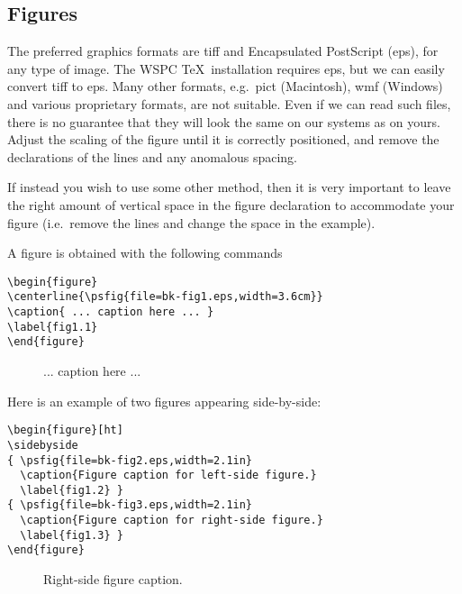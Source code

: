 \subsection{Figures}
The preferred graphics formats are tiff and Encapsulated PostScript
(eps), for any type of image. The WSPC \TeX\ installation requires
eps, but we can easily convert tiff to eps. Many other formats,
e.g.~pict (Macintosh), wmf (Windows) and various proprietary
formats, are not suitable. Even if we can read such files, there is
no guarantee that they will look the same on our systems as on
yours. Adjust the scaling of the figure until it is correctly
positioned, and remove the declarations of the lines and any
anomalous spacing.

If instead you wish to use some other method, then it is very
important to leave the right amount of vertical space in the figure
declaration to accommodate your figure (i.e.~remove the lines and
change the space in the example).

A figure is obtained with the following commands
\begin{verbatim}
\begin{figure}
\centerline{\psfig{file=bk-fig1.eps,width=3.6cm}}
\caption{ ... caption here ... }
\label{fig1.1}
\end{figure}
\end{verbatim}

\begin{figure}
\centerline{}
\caption{ ... caption here ... }
\label{fig1.1}
\end{figure}

Here is an example of two figures appearing side-by-side:
\begin{verbatim}
\begin{figure}[ht]
\sidebyside
{ \psfig{file=bk-fig2.eps,width=2.1in}
  \caption{Figure caption for left-side figure.}
  \label{fig1.2} }
{ \psfig{file=bk-fig3.eps,width=2.1in}
  \caption{Figure caption for right-side figure.}
  \label{fig1.3} }
\end{figure}
\end{verbatim}

\begin{figure}[ht]
\sidebyside
{
    \caption{Left-side figure caption.}\label{fig1.2}
}{
    \caption{Right-side figure caption.}\label{fig1.3}
}
\end{figure}

